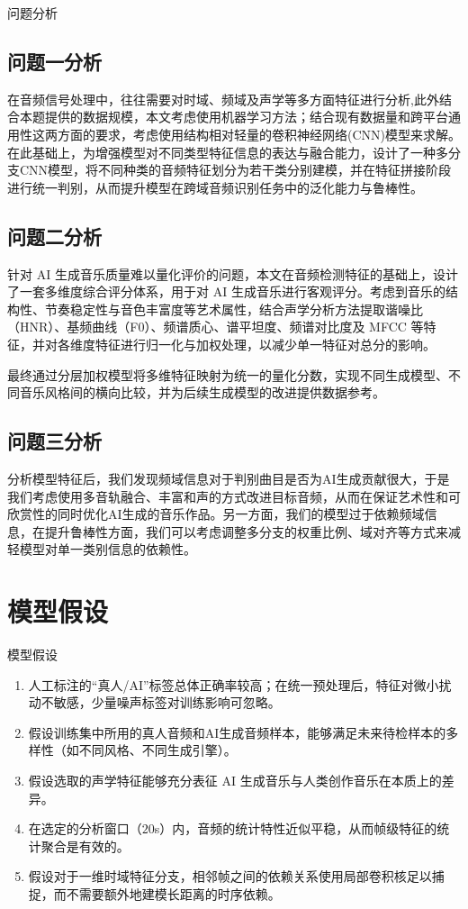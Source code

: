 \documentclass[aspectratio=169]{beamer}
\begin{document}
\begin{frame}{问题分析}
\small
\subsection{问题一分析}
 在音频信号处理中，往往需要对时域、频域及声学等多方面特征进行分析,此外结合本题提供的数据规模，本文考虑使用机器学习方法；结合现有数据量和跨平台通用性这两方面的要求，考虑使用结构相对轻量的卷积神经网络(CNN)模型来求解。在此基础上，为增强模型对不同类型特征信息的表达与融合能力，设计了一种多分支CNN模型，将不同种类的音频特征划分为若干类分别建模，并在特征拼接阶段进行统一判别，从而提升模型在跨域音频识别任务中的泛化能力与鲁棒性。

\subsection{问题二分析}

针对 AI 生成音乐质量难以量化评价的问题，本文在音频检测特征的基础上，设计了一套多维度综合评分体系，用于对 AI 生成音乐进行客观评分。考虑到音乐的结构性、节奏稳定性与音色丰富度等艺术属性，结合声学分析方法提取谐噪比（HNR）、基频曲线（F0）、频谱质心、谱平坦度、频谱对比度及 MFCC 等特征，并对各维度特征进行归一化与加权处理，以减少单一特征对总分的影响。

最终通过分层加权模型将多维特征映射为统一的量化分数，实现不同生成模型、不同音乐风格间的横向比较，并为后续生成模型的改进提供数据参考。
\subsection{问题三分析}
分析模型特征后，我们发现频域信息对于判别曲目是否为AI生成贡献很大，于是我们考虑使用多音轨融合、丰富和声的方式改进目标音频，从而在保证艺术性和可欣赏性的同时优化AI生成的音乐作品。另一方面，我们的模型过于依赖频域信息，在提升鲁棒性方面，我们可以考虑调整多分支的权重比例、域对齐等方式来减轻模型对单一类别信息的依赖性。
\end{frame}

\section{模型假设}

\begin{frame}{模型假设}
\small
\begin{enumerate}
    \item 人工标注的“真人/AI”标签总体正确率较高；在统一预处理后，特征对微小扰动不敏感，少量噪声标签对训练影响可忽略。
    \item 假设训练集中所用的真人音频和AI生成音频样本，能够满足未来待检样本的多样性（如不同风格、不同生成引擎）。
    \item 假设选取的声学特征能够充分表征 AI 生成音乐与人类创作音乐在本质上的差异。
    \item 在选定的分析窗口（$20$s）内，音频的统计特性近似平稳，从而帧级特征的统计聚合是有效的。
    \item 假设对于一维时域特征分支，相邻帧之间的依赖关系使用局部卷积核足以捕捉，而不需要额外地建模长距离的时序依赖。
    
\end{enumerate}
\end{frame}
\end{document}
